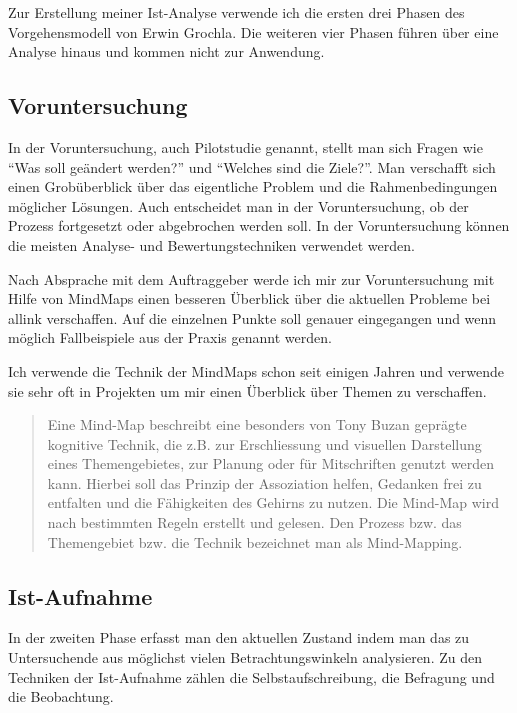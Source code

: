 Zur Erstellung meiner Ist-Analyse verwende ich die ersten drei Phasen des 
Vorgehensmodell von Erwin Grochla\cite[S. 44-74]{grochla1982grundlagen}.
Die weiteren vier Phasen führen über eine Analyse hinaus und kommen
nicht zur Anwendung.

\subsection{Voruntersuchung}
In der Voruntersuchung, auch Pilotstudie genannt, stellt man sich Fragen wie
``Was soll geändert werden?'' und ``Welches sind die Ziele?''. Man verschafft
sich einen Grobüberblick über das eigentliche Problem und die Rahmenbedingungen
möglicher Lösungen. Auch entscheidet man in der Voruntersuchung, ob der Prozess
fortgesetzt oder abgebrochen werden soll. In der Voruntersuchung können die 
meisten Analyse- und Bewertungstechniken verwendet werden.

Nach Absprache mit dem Auftraggeber werde ich mir zur Voruntersuchung mit  
Hilfe von MindMaps einen besseren Überblick über die aktuellen Probleme bei
allink verschaffen. Auf die einzelnen Punkte soll genauer eingegangen
und wenn möglich Fallbeispiele aus der Praxis genannt werden.

Ich verwende die Technik der MindMaps schon seit einigen Jahren und verwende
sie sehr oft in Projekten um mir einen Überblick über Themen zu verschaffen.

\begin{quotation}
Eine Mind-Map beschreibt eine besonders von Tony Buzan geprägte kognitive 
Technik, die z.B. zur Erschliessung und visuellen Darstellung eines Themengebietes, 
zur Planung oder für Mitschriften genutzt werden kann. Hierbei soll das Prinzip 
der Assoziation helfen, Gedanken frei zu entfalten und die Fähigkeiten des Gehirns 
zu nutzen. Die Mind-Map wird nach bestimmten Regeln erstellt und gelesen. Den 
Prozess bzw. das Themengebiet bzw. die Technik bezeichnet man als Mind-Mapping.
\cite{wikipedia_mindmap}
\end{quotation}

\subsection{Ist-Aufnahme}
In der zweiten Phase erfasst man den aktuellen Zustand indem man das zu 
Untersuchende aus möglichst vielen Betrachtungswinkeln analysieren. Zu den
Techniken der Ist-Aufnahme zählen die Selbstaufschreibung, die Befragung und 
die Beobachtung.

